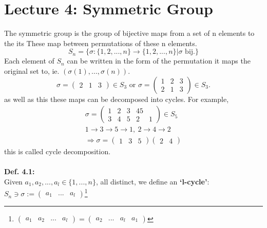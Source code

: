 \documentclass{article}
\begin{document}
\section{Lecture 4: Symmetric Group}
The symmetric group is the group of bijective maps from a set of n elements to the its These map between permutations of these n elements.
\begin{equation}
S_n=\lbrace \sigma:\lbrace 1,2,...,n\rbrace\rightarrow\lbrace1,2,...,n\rbrace|\sigma \text{ bij}.\rbrace
\end{equation}
Each element of $S_n$ can be written in the form of the permutation it maps the original set to, ie. $\left(\sigma(1),...,\sigma(n)\right)$. \\
\begin{equation}
\sigma = \begin{pmatrix}
2&1&3
\end{pmatrix} \in S_3
\text{ or } \sigma =\begin{pmatrix}
1&2&3\\ 2&1&3
\end{pmatrix}\in S_3.
\end{equation}
as well as this these maps can be decomposed into cycles. For example,
\begin{align*}
\sigma=\begin{pmatrix}
1&2&3&45\\ 3&4&5&2&1
\end{pmatrix}\in S_5\\
1\rightarrow 3 \rightarrow 5 \rightarrow 1,~2\rightarrow 4 \rightarrow 2\\
\Rightarrow \sigma = \begin{pmatrix}
1&3&5
\end{pmatrix}\begin{pmatrix}
2&4
\end{pmatrix}
\end{align*}
this is called cycle decomposition.\\
\vspace{2mm}~\\
\textbf{Def. 4.1:}\\
Given $a_1,a_2,...,a_l\in \lbrace 1,...,n\rbrace$, all distinct, we define an \textbf{`l-cycle'}: $S_n\ni\sigma:=\begin{pmatrix}
a_1&...&a_l
\end{pmatrix}$\footnote{$\begin{pmatrix}
a_1&a_2&...&a_l
\end{pmatrix}=\begin{pmatrix}
a_2&...&a_l&a_1
\end{pmatrix}$}
\end{document}
